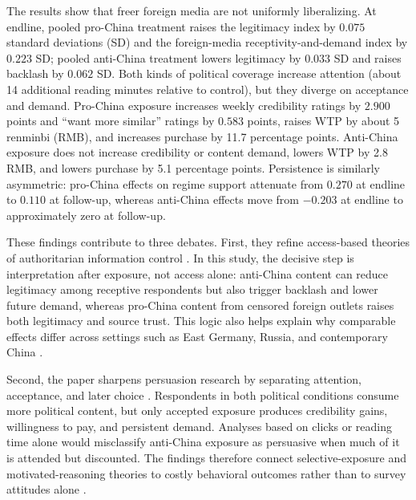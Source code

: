 \documentclass[12pt,american]{article}
\begin{document}
	The results show that freer foreign media are not uniformly liberalizing. At endline, pooled pro-China treatment raises the legitimacy index by \(0.075\) standard deviations (SD) and the foreign-media receptivity-and-demand index by \(0.223\) SD; pooled anti-China treatment lowers legitimacy by \(0.033\) SD and raises backlash by \(0.062\) SD. Both kinds of political coverage increase attention (about 14 additional reading minutes relative to control), but they diverge on acceptance and demand. Pro-China exposure increases weekly credibility ratings by \(2.900\) points and ``want more similar'' ratings by \(0.583\) points, raises WTP by about 5 renminbi (RMB), and increases purchase by 11.7 percentage points. Anti-China exposure does not increase credibility or content demand, lowers WTP by 2.8 RMB, and lowers purchase by 5.1 percentage points. Persistence is similarly asymmetric: pro-China effects on regime support attenuate from \(0.270\) at endline to \(0.110\) at follow-up, whereas anti-China effects move from \(-0.203\) at endline to approximately zero at follow-up.
	
	These findings contribute to three debates. First, they refine access-based theories of authoritarian information control \citep{BesleyPrat2006,gurievtreisman2019,roberts2018,RosenfeldWallace2024}. In this study, the decisive step is interpretation after exposure, not access alone: anti-China content can reduce legitimacy among receptive respondents but also trigger backlash and lower future demand, whereas pro-China content from censored foreign outlets raises both legitimacy and source trust. This logic also helps explain why comparable effects differ across settings such as East Germany, Russia, and contemporary China \citep{KernHainmueller2009,EnikolopovPetrovaZhuravskaya2011,QinStrombergWu2017,kingpanroberts2013}.
	
	Second, the paper sharpens persuasion research by separating attention, acceptance, and later choice \citep{ArceneauxJohnson2013,Prior2007CUP,zaller1992,taberlodge2006,ValloneRossLepper1985,Levendusky2013}. Respondents in both political conditions consume more political content, but only accepted exposure produces credibility gains, willingness to pay, and persistent demand. Analyses based on clicks or reading time alone would misclassify anti-China exposure as persuasive when much of it is attended but discounted. The findings therefore connect selective-exposure and motivated-reasoning theories to costly behavioral outcomes rather than to survey attitudes alone \citep{BakshyMessingAdamic2015,FlaxmanGoelRao2016,GonzalezBailonEtAl2023,KangSheen2025,shen2025forced}.
	
\end{document}

